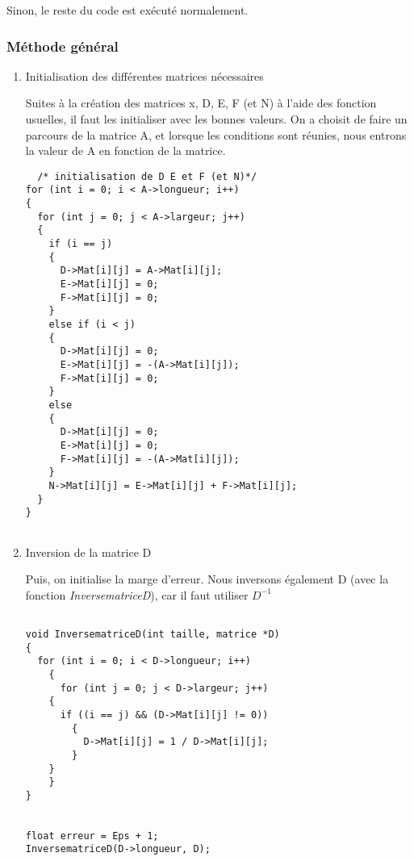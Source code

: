 \documentclass[letter]{article}
\begin{document}
Sinon, le reste du code est exécuté normalement.








\subsubsection{Méthode général}
\label{sec:orgdab054a}

\begin{enumerate}
\item Initialisation des différentes matrices nécessaires
\label{sec:org6af8c63}

Suites à la création des matrices x, D, E, F (et N) à l'aide des fonction usuelles, il faut les initialiser avec les bonnes valeurs. On a choisit de faire un parcours de la matrice A, et lorsque les conditions sont réunies, nous entrons la valeur de A en fonction de la matrice.

\begin{verbatim}
  /* initialisation de D E et F (et N)*/
for (int i = 0; i < A->longueur; i++)
{
  for (int j = 0; j < A->largeur; j++)
  {
    if (i == j)
    {
      D->Mat[i][j] = A->Mat[i][j];
      E->Mat[i][j] = 0;
      F->Mat[i][j] = 0;
    }
    else if (i < j)
    {
      D->Mat[i][j] = 0;
      E->Mat[i][j] = -(A->Mat[i][j]);
      F->Mat[i][j] = 0;
    }
    else
    {
      D->Mat[i][j] = 0;
      E->Mat[i][j] = 0;
      F->Mat[i][j] = -(A->Mat[i][j]);
    }
    N->Mat[i][j] = E->Mat[i][j] + F->Mat[i][j];
  }
}


\end{verbatim}



\item Inversion de la matrice D
\label{sec:org4c7b7d5}

Puis, on initialise la marge d'erreur. Nous inversons également D (avec la fonction \emph{InversematriceD}), car il faut utiliser \(D^{-1}\)


\begin{verbatim}

void InversematriceD(int taille, matrice *D)
{
  for (int i = 0; i < D->longueur; i++)
    {
      for (int j = 0; j < D->largeur; j++)
	{
	  if ((i == j) && (D->Mat[i][j] != 0))
	    {
	      D->Mat[i][j] = 1 / D->Mat[i][j];
	    }
	}
    }
}


float erreur = Eps + 1;
InversematriceD(D->longueur, D);


\end{verbatim}





\end{enumerate}
\end{document}
